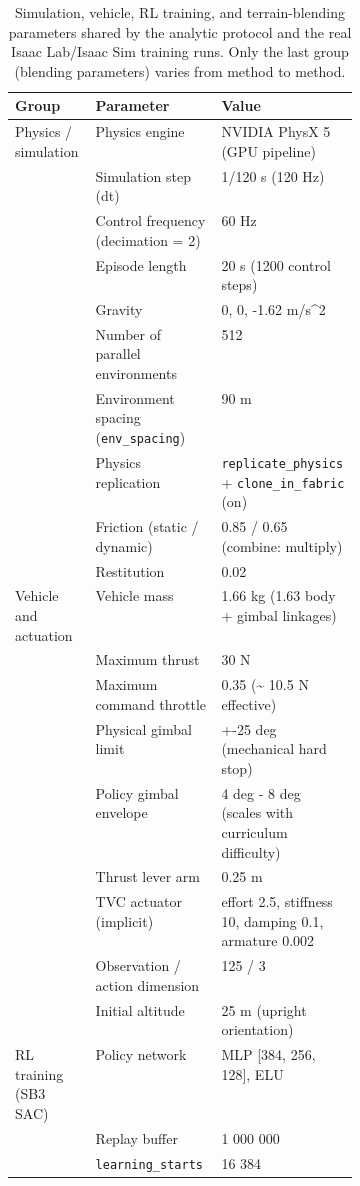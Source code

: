 \begin{table}[htb]
\centering
\caption{Simulation, vehicle, RL training, and terrain-blending parameters shared by the analytic protocol and the real Isaac Lab/Isaac Sim training runs. Only the last group (blending parameters) varies from method to method.}
\label{tab:simconfig}
\footnotesize
\setlength{\tabcolsep}{4pt}
\begin{tabular}{@{}llp{0.40\linewidth}@{}}
\toprule
Group & Parameter & Value \\
\midrule
Physics / simulation & Physics engine & NVIDIA PhysX 5 (GPU pipeline) \\
 & Simulation step (dt) & 1/120 s (120 Hz) \\
 & Control frequency (decimation = 2) & 60 Hz \\
 & Episode length & 20 s (1200 control steps) \\
 & Gravity & 0, 0, -1.62 m/s\textasciicircum{}2 \\
 & Number of parallel environments & 512 \\
 & Environment spacing (\texttt{env\_spacing}) & 90 m \\
 & Physics replication & \texttt{replicate\_physics} + \texttt{clone\_in\_fabric} (on) \\
 & Friction (static / dynamic) & 0.85 / 0.65 (combine: multiply) \\
 & Restitution & 0.02 \\
Vehicle and actuation & Vehicle mass & 1.66 kg (1.63 body + gimbal linkages) \\
 & Maximum thrust & 30 N \\
 & Maximum command throttle & 0.35 (\textasciitilde{} 10.5 N effective) \\
 & Physical gimbal limit & +-25 deg (mechanical hard stop) \\
 & Policy gimbal envelope & 4 deg - 8 deg (scales with curriculum difficulty) \\
 & Thrust lever arm & 0.25 m \\
 & TVC actuator (implicit) & effort 2.5, stiffness 10, damping 0.1, armature 0.002 \\
 & Observation / action dimension & 125 / 3 \\
 & Initial altitude & 25 m (upright orientation) \\
RL training (SB3 SAC) & Policy network & MLP [384, 256, 128], ELU \\
 & Replay buffer & 1 000 000 \\
 & \texttt{learning\_starts} & 16 384 \\

\end{tabular}
\end{table}

